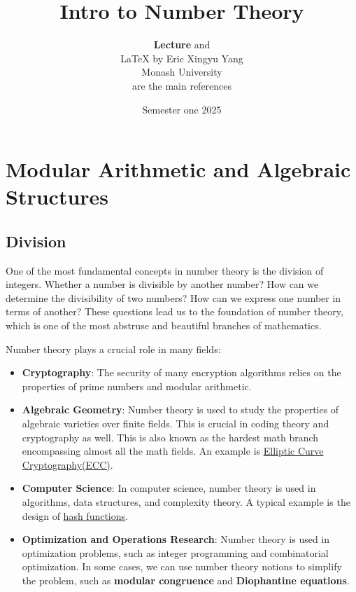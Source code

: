 \documentclass[oneside]{book}
\def\notetitle{Intro to Number Theory}
\def\noteauthor{
    \textbf{Lecture} and\\ 
    {\LaTeX} by Eric Xingyu Yang\\
    Monash University\\
	\textcite{rosenDiscreteMathematicsIts2018,rosenElementaryNumberTheory2010} are the main references
	}
\def\notedate{Semester one 2025}
\begin{document}
\title{\textbf{
		\LARGE{\notetitle} \vspace*{10\baselineskip}}
}
\author{\noteauthor}
\date{\notedate}

\maketitle
\newpage

\tableofcontents
\newpage


\chapter{Modular Arithmetic and Algebraic Structures}
\section{Division}
One of the most fundamental concepts in number theory is the division of integers.
Whether a number is divisible by another number? How can we determine the
divisibility of two numbers? How can we express one number in terms of another?
These questions lead us to the foundation of number theory, which is one of the most
abstruse and beautiful branches of mathematics.

Number theory plays a crucial role in many fields:
\begin{itemize}
	\item \textbf{Cryptography}: The security of many encryption algorithms relies on the properties of prime numbers and modular arithmetic.
	\item \textbf{Algebraic Geometry}: Number theory is used to study the properties of algebraic varieties over finite fields. This is
	      crucial in coding theory and cryptography as well. This is also known as the hardest math branch encompassing almost all the math fields.
	      An example is
	      \href{https://cryptobook.nakov.com/asymmetric-key-ciphers/elliptic-curve-cryptography-ecc}{Elliptic Curve Cryptography(ECC)}.
	\item \textbf{Computer Science}: In computer science, number theory is used in algorithms, data structures, and complexity theory.
	      A typical example is the design of \href{https://en.wikipedia.org/wiki/Hash_function}{hash functions}.
	\item \textbf{Optimization and Operations Research}: Number theory is used in optimization problems, such as integer programming and combinatorial optimization.
	      In some cases, we can use number theory notions to simplify the problem, such as \textbf{modular congruence} and \textbf{Diophantine equations}.
\end{itemize}
\end{document}
